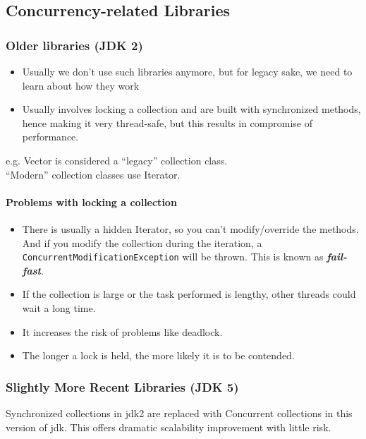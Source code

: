 \documentclass[a4paper]{article}
\begin{document}
\subsection{Concurrency-related Libraries}
\subsubsection{Older libraries (JDK 2)}
\begin{itemize}
	\item Usually we don't use such libraries anymore, but for legacy sake, we need to learn about how they work
	\item Usually involves locking a collection and are built with synchronized methods, hence making it very thread-safe, but this results in compromise of performance.
\end{itemize}
\begin{framed}
	\begin{displayquote}
		e.g. Vector is considered a “legacy” collection class.\\
		“Modern” collection classes use Iterator.
	\end{displayquote}
\end{framed}

\paragraph{Problems with locking a collection}
\begin{itemize}
	\item There is usually a hidden Iterator, so you can't modify/override the methods. And if you modify the collection during the iteration, a \texttt{ConcurrentModificationException} will be thrown. This is known as \textbf{\textit{fail-fast}}.
	\item If the collection is large or the task performed is lengthy, other threads could wait a long time.
	\item It increases the risk of problems like deadlock.
	\item The longer a lock is held, the more likely it is to be contended.
\end{itemize}
\subsubsection{Slightly More Recent Libraries (JDK 5)}
Synchronized collections in jdk2 are replaced with Concurrent collections in this version of jdk. This offers dramatic scalability improvement with little risk.
\end{document}
